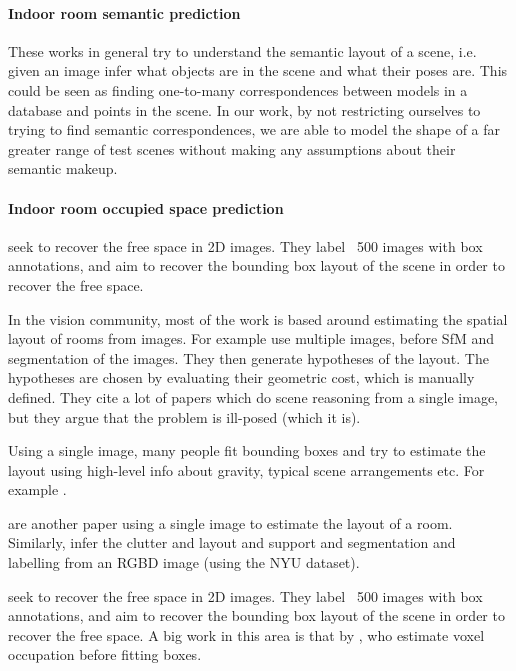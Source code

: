 \documentclass[10pt,a4paper, twocolumn]{article}
\makeatletter
\newcommand*{\ie}{i.e.\@\xspace}
\makeatother
\begin{document}
\paragraph{Indoor room semantic prediction}
These works in general try to understand the semantic layout of a scene, \ie given an image infer what objects are in the scene and what their poses are.
\cite{nan-acm-2012, minkim-siggraphasia-2012}
This could be seen as finding one-to-many correspondences between models in a database and points in the scene.
In our work, by not restricting ourselves to trying to find semantic correspondences, we are able to model the shape of a far greater range of test scenes without making any assumptions about their semantic makeup.

\paragraph{Indoor room occupied space prediction}
\cite{hedau-cvpr-2012} seek to recover the free space in 2D images. They label ~500 images with box annotations, and aim to recover the bounding box layout of the scene in order to recover the free space.

In the vision community, most of the work is based around estimating the spatial layout of rooms from images.
For example \cite{bao-wacv-2014} use multiple images, before SfM and segmentation of the images. 
They then generate hypotheses of the layout. 
The hypotheses are chosen by evaluating their geometric cost, which is manually defined. 
They cite a lot of papers which do scene reasoning from a single image, but they argue that the problem is ill-posed (which it is). 

Using a single image, many people fit bounding boxes and try to estimate the layout using high-level info about gravity, typical scene arrangements etc. 
For example \cite{choi-cvpr-2013}.

\cite{lee-nips-2010} are another paper using a single image to estimate the layout of a room. 
Similarly, \cite{zhang-iccv-2013} infer the clutter and layout and support and segmentation and labelling from an RGBD image (using the NYU dataset).

\cite{hedau-cvpr-2012} seek to recover the free space in 2D images. 
They label ~500 images with box annotations, and aim to recover the bounding box layout of the scene in order to recover the free space. 
A big work in this area is that by \cite{gupta-cvpr-2011}, who estimate voxel occupation before fitting boxes.
\end{document}
